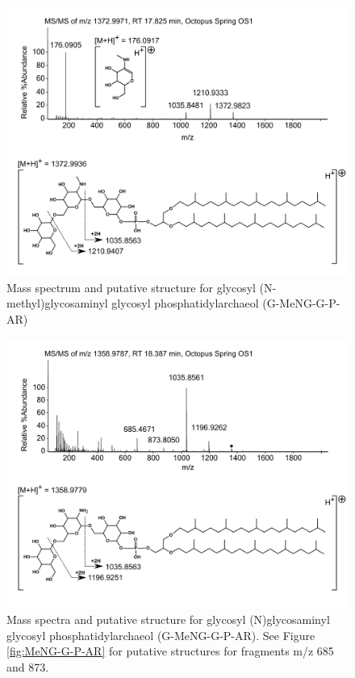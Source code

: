 \begin{figure}[h]
\centering
\includegraphics[width=\linewidth]{figs_app1/G-MeNG-G-P-AR}
\caption{Mass spectrum and putative structure for glycosyl (N-methyl)glycosaminyl glycosyl phosphatidylarchaeol (G-MeNG-G-P-AR)}
\label{fig:G-MeNG-G-P-AR}
\end{figure}


\begin{figure}[h]
\centering
\includegraphics[width=\linewidth]{figs_app1/G-NG-G-P-AR}
\caption[Mass spectra and putative structure for glycosyl (N)glycosaminyl glycosyl phosphatidylarchaeol (G-MeNG-G-P-AR)]{Mass spectra and putative structure for glycosyl (N)glycosaminyl glycosyl phosphatidylarchaeol (G-MeNG-G-P-AR). See Figure \ref{fig:MeNG-G-P-AR} for putative structures for fragments m/z 685 and 873.}
\label{fig:G-NG-G-P-AR}
\end{figure}


